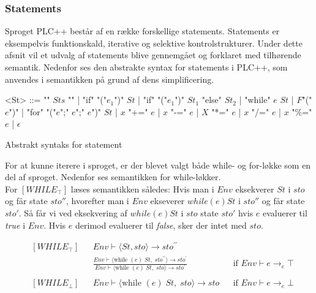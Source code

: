 \noindent \subsubsection{Statements}
Sproget PLC++ består af en række forskellige statements. Statements er eksempelvis funktionskald, iterative og selektive kontrolstrukturer. Under dette afsnit vil et udvalg af statements blive gennemgået og forklaret med tilhørende semantik. Nedenfor ses den abstrakte syntax for statements i PLC++, som anvendes i semantikken på grund af dens simplificering.

\begin{Grammar}
 \begin{grammar}
 <St> ::= "{" $Sts$ "}" | "if" "("$e_1$")" $St$ | "if" "("$e_1$")" $St_1$ "else" $St_2$ | "while" $e$ $St$ | $F$"("$e$")" | "for" "("$e$";" $e$";" $e$")" $St$ | $x$ "+=" $e$ | $x$ "-=" $e$ | $X$ "*=" $e$ | $x$ "/=" $e$ | $x$ "\%=" $e$ | $\epsilon$
 \end{grammar}
 \caption{Abstrakt syntaks for statement}\label{gra:Statements}
\end{Grammar}


For at kunne iterere i sproget, er der blevet valgt både while- og for-løkke som en del af sproget. Nedenfor ses semantikken for while-løkker. \\

\noindent For $[WHILE_\top]$ læses semantikken således: 
Hvis man i $Env$ eksekverer $St$ i $sto$ og får state $sto''$, hvorefter man i $Env$ ekseverer $while(e) St$ i $sto''$ og får state $sto'$. Så får vi ved eksekvering af $while(e) St$ i $sto$ state $sto'$ hvis $e$ evaluerer til \textit{true} i $Env$. Hvis $e$ derimod evaluerer til \textit{false}, sker der intet med $sto$.

\begin{align*}
&[WHILE_\top] & &Env \vdash \langle St, sto \rangle \rightarrow sto^{\prime\prime}\\
& & &\frac{Env \vdash \langle \text{while } (e)\; St,\; sto^{\prime\prime} \rangle \rightarrow sto^\prime}{Env \vdash \langle \text{while } (e)\; St,\; sto \rangle \rightarrow sto^\prime} & &\text{if } Env \vdash e \rightarrow_e \top\\\\
%
&[WHILE_\bot] & &Env \vdash \langle \text{while } (e)\; St,\; sto \rangle \rightarrow sto & &\text{if } Env \vdash e \rightarrow_e \bot\\\\
\end{align*}

